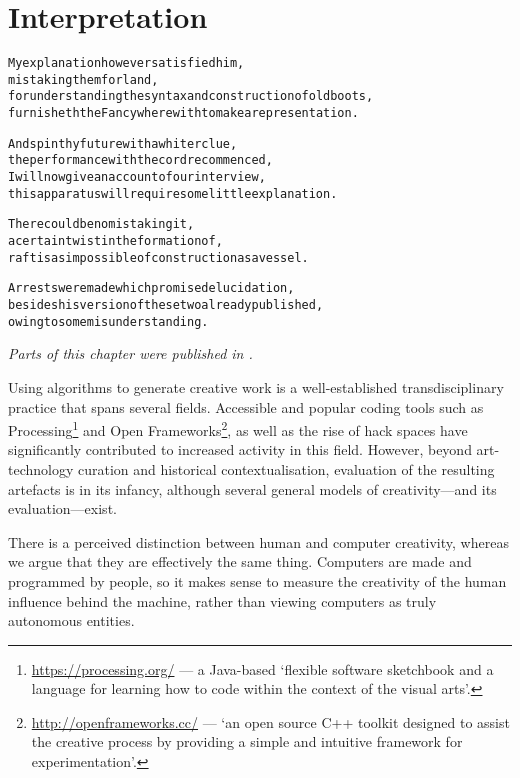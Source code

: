 
\chapter{Interpretation}
\label{ch:interpretation}

\startcontents[chapters]

\vfill

\begin{alltt}\sffamily
My explanation however satisfied him,
mistaking them for land,
for understanding the syntax and construction of old boots,
furnisheth the Fancy wherewith to make a representation.

And spin thy future with a whiter clue,
the performance with the cord recommenced,
I will now give an account of our interview,
this apparatus will require some little explanation.

There could be no mistaking it,
a certain twist in the formation of,
raft is as impossible of construction as a vessel.

Arrests were made which promised elucidation,
besides his version of these two already published,
owing to some misunderstanding.
\end{alltt}

\newpage
\minicontents
\spirals

\emph{Parts of this chapter were published in \autocite{Raczinski2016}.}

\spirals


Using algorithms to generate creative work is a well-established transdisciplinary practice that spans several fields. Accessible and popular coding tools such as Processing\footnote{\url{https://processing.org/} --- a Java-based `flexible software sketchbook and a language for learning how to code within the context of the visual arts'.} and Open Frameworks\footnote{\url{http://openframeworks.cc/} --- `an open source C++ toolkit designed to assist the creative process by providing a simple and intuitive framework for experimentation'.}, as well as the rise of hack spaces have significantly contributed to increased activity in this field. However, beyond art-technology curation and historical contextualisation, evaluation of the resulting artefacts is in its infancy, although several general models of creativity---and its evaluation---exist.

There is a perceived distinction between human and computer creativity, whereas \colorbox{red!30}{we} argue that they are effectively the same thing. Computers are made and programmed by people, so it makes sense to measure the creativity of the human influence behind the machine, rather than viewing computers as truly autonomous entities.

